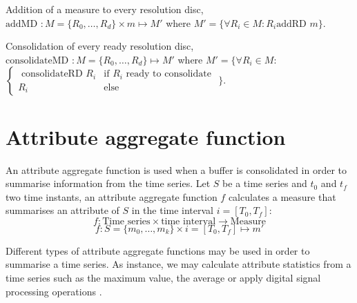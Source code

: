

Addition of a measure to every
resolution disc, $\text{addMD } : M=\{R_0,\dotsc,R_d\} \times m
\mapsto M' $ where $M'= \{ \forall R_i\in M: R_i \text{
  addRD } m \}$.


Consolidation of every ready resolution disc,
 $\text{consolidateMD } :
M=\{R_0,\dotsc,R_d\} \mapsto M'$ where $ M'= \big\{ \forall R_i\in M:$
  $\begin{cases}
    \text{ consolidateRD } R_i & \text{if } R_i \text{ ready to consolidate} \\
    R_i & \text{else }
  \end{cases}$ $\big\}
  $.








\section{Attribute aggregate function}
\label{sec:model:interpolador}


An attribute aggregate function is used when a buffer is
consolidated in order to summarise information from the time series.
Let $S$ be a time series and $t_0$ and $t_f$ two time instants, an
attribute aggregate function $f$ calculates a measure that
summarises an attribute of $S$ in the time interval $i=[T_0,T_f]$:
\[
f: \text{Time series} \times \text{time interval} \longrightarrow
\text{Measure}
\]
\[
f: S=\{m_0,\ldots,m_k\} \times i=[T_0,T_f] \mapsto m'
\]

Different types of attribute aggregate functions may be used in order
to summarise a time series. As instance, we may calculate attribute
statistics from a time series such as the maximum value, the average
or apply digital signal processing operations \cite{zhang11}.

